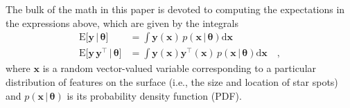 \documentclass[modern]{aastex62}
\begin{document}
The bulk of the math in this paper is devoted to computing
the expectations in the expressions above, which
are given by the integrals
%
\begin{align}
    \label{eq:exp_y}
    \mathrm{E} \Big[ \mathbf{y} \, \Big| \, \pmb{\theta} \Big]
     & =
    \int \mathbf{y}(\mathbf{x} ) \, p(\mathbf{x} \, \big| \, \pmb{\theta})\mathrm{d}\mathbf{x}
    \\
    \label{eq:exp_yy}
    \mathrm{E} \Big[ \mathbf{y} \, \mathbf{y}^\top \, \Big| \, \pmb{\theta} \Big]
     & =
    \int \mathbf{y}(\mathbf{x} ) \mathbf{y}^\top(\mathbf{x} ) \, p(\mathbf{x} \, \big| \, \pmb{\theta})\mathrm{d}\mathbf{x}
    \quad,
\end{align}
%
where $\mathbf{x}$ is a random vector-valued variable corresponding to a particular
distribution of features on the surface  (i.e., the size and location of star spots)
and $p(\mathbf{x} \, \big| \, \pmb{\theta})$ is its probability density
function (PDF).
\end{document}
